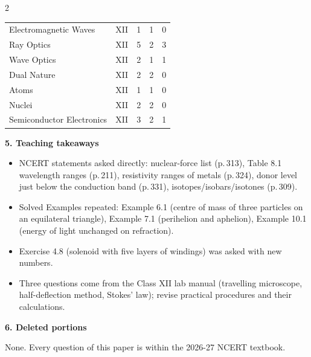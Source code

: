 \begin{multicols}{2}
{\begin{tabular}{@{}p{4.7cm}c@{\,}r@{\,}r@{\,}r@{}}
Electromagnetic Waves & XII & 1 & 1 & 0\\
Ray Optics & XII & 5 & 2 & 3\\
Wave Optics & XII & 2 & 1 & 1\\
Dual Nature & XII & 2 & 2 & 0\\
Atoms & XII & 1 & 1 & 0\\
Nuclei & XII & 2 & 2 & 0\\
Semiconductor Electronics & XII & 3 & 2 & 1\\
\bottomrule\end{tabular}}\par\medskip
\textbf{\color{crimson}5. Teaching takeaways}\par\smallskip
{\footnotesize\begin{itemize}[leftmargin=1em,nosep]
\item NCERT statements asked directly: nuclear-force list (p.\,313), Table 8.1 wavelength ranges (p.\,211), resistivity ranges of metals (p.\,324), donor level just below the conduction band (p.\,331), isotopes/isobars/isotones (p.\,309).
\item Solved Examples repeated: Example 6.1 (centre of mass of three particles on an equilateral triangle), Example 7.1 (perihelion and aphelion), Example 10.1 (energy of light unchanged on refraction).
\item Exercise 4.8 (solenoid with five layers of windings) was asked with new numbers.
\item Three questions come from the Class XII lab manual (travelling microscope, half-deflection method, Stokes' law); revise practical procedures and their calculations.
\end{itemize}}\par\medskip
\textbf{\color{crimson}6. Deleted portions}\par\smallskip
None. Every question of this paper is within the 2026-27 NCERT textbook.\par
\end{multicols}







